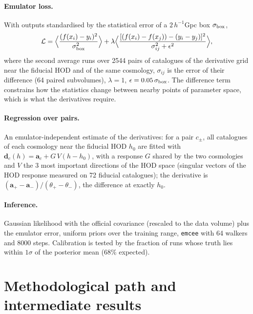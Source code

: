 \documentclass[11pt,twocolumn]{article}
\begin{document}
\paragraph{Emulator loss.} With outputs standardised by the statistical error of a $2\,h^{-1}$Gpc box $\sigma_{\rm box}$,
\begin{equation}
\mathcal L = \Big\langle \frac{(f(x_i) - y_i)^2}{\sigma_{\rm box}^2}\Big\rangle + \lambda \Big\langle \frac{[(f(x_i) - f(x_j)) - (y_i - y_j)]^2}{\sigma_{ij}^2 + \epsilon^2}\Big\rangle,
\end{equation}
where the second average runs over 2544 pairs of catalogues of the derivative grid near the fiducial HOD and of the same cosmology, $\sigma_{ij}$ is the error of their difference (64 paired subvolumes), $\lambda=1$, $\epsilon=0.05\,\sigma_{\rm box}$. The difference term constrains how the statistics change between nearby points of parameter space, which is what the derivatives require.

\paragraph{Regression over pairs.} An emulator-independent estimate of the derivatives: for a pair $c_\pm$, all catalogues of each cosmology near the fiducial HOD $h_0$ are fitted with $\boldsymbol d_c(h) = \boldsymbol a_c + G\,V(h-h_0)$, with a response $G$ shared by the two cosmologies and $V$ the 3 most important directions of the HOD space (singular vectors of the HOD response measured on 72 fiducial catalogues); the derivative is $(\boldsymbol a_+ - \boldsymbol a_-)/(\theta_+-\theta_-)$, the difference at exactly $h_0$.

\paragraph{Inference.} Gaussian likelihood with the official covariance (rescaled to the data volume) plus the emulator error, uniform priors over the training range, \texttt{emcee} with 64 walkers and 8000 steps. Calibration is tested by the fraction of runs whose truth lies within $1\sigma$ of the posterior mean (68\% expected).

\section{Methodological path and intermediate results}
\label{app:path}
\end{document}
